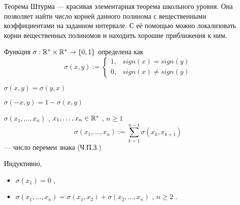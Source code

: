 



    
\SScover
    

Теорема Штурма --- красивая элементарная теорема школьного уровня. Она позволяет найти число корней данного полинома с вещественными коэффициентами на заданном интервале.
С её помощью можно локализовать корни вещественных полиномов и находить хорошие приближения к ним.

\vspace

\SSbullet 


\SSsect[def] Функция \( \sigma: \mathbb{R}^* \times \mathbb{R}^* \rightarrow \{0,1\} \) определена как
\[ \sigma(x,y) := 
   \begin{cases} 
       1, & sign(x) = sign(y) \\ 
       0, & sign(x) \neq sign(y)
   \end{cases} 
\]

\SSsect \( \sigma(x,y) = \sigma(y,x) \)

\SSsect \( \sigma(-x,y) = 1 - \sigma(x,y) \)

\SSsect[def] \( \sigma(x_1,\dots,x_n) \) , \( x_1,\dots,x_n \in \mathbb{R}^* \) , \( n \geqslant 1 \)
\[ \sigma(x_1,\dots,x_n) := \sum_{k=1}^{n-1} \sigma(x_k,x_{k+1})
\]
--- число перемен знака (Ч.П.З.)

\SSsect Индуктивно,
\begin{itemize}[label=]
\item \( \sigma(x_1) = 0 \) ,
\item \( \sigma(x_1,\dots,x_n) = \sigma(x_1,x_2) + \sigma(x_2,\dots,x_n) \) , \( n \geqslant 2 \) .
\end{itemize}

\vspace

